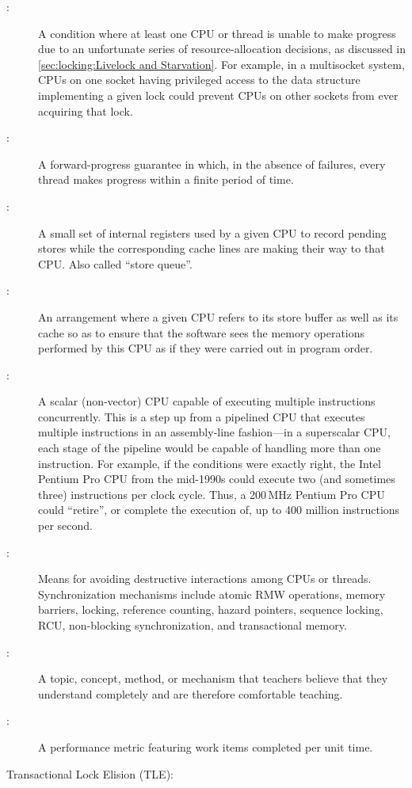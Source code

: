 \begin{description}
\item[:]
	A condition where at least one CPU or thread is unable to make
	progress due to an unfortunate series of resource-allocation
	decisions, as discussed in
	\cref{sec:locking:Livelock and Starvation}.
	For example, in a multisocket system, CPUs on one socket having
	privileged access to the data structure implementing a given lock
	could prevent CPUs on other sockets from ever acquiring that lock.
\item[:]
	A forward-progress guarantee in which, in the absence of
	failures, every thread makes progress within a finite
	period of time.
\item[:]
	A small set of internal registers used by a given CPU
	to record pending stores
	while the corresponding cache lines are making their
	way to that CPU\@.
	Also called ``store queue''.
\item[:]
	An arrangement where a given CPU refers to its store buffer
	as well as its cache so as to ensure that the software sees
	the memory operations performed by this CPU as if they
	were carried out in program order.
\item[:]
	A scalar (non-vector) CPU capable of executing multiple instructions
	concurrently.
	This is a step up from a pipelined CPU that executes multiple
	instructions in an assembly-line fashion---in a superscalar
	CPU, each stage of the pipeline would be capable of handling
	more than one instruction.
	For example, if the conditions were exactly right,
	the Intel Pentium Pro CPU from the mid-1990s could
	execute two (and sometimes three) instructions per clock cycle.
	Thus, a 200\,MHz Pentium Pro CPU could ``retire'', or complete the
	execution of, up to 400 million instructions per second.
\item[:]
	Means for avoiding destructive interactions among CPUs or threads.
	Synchronization mechanisms include atomic RMW operations, memory
	barriers, locking, reference counting, hazard pointers, sequence
	locking, RCU, non-blocking synchronization, and transactional
	memory.
\item[:]
	A topic, concept, method, or mechanism that teachers believe that
	they understand completely and are therefore comfortable teaching.
\item[:]
	A performance metric featuring work items completed per unit time.
\item[Transactional Lock Elision (TLE):]

\end{description}
